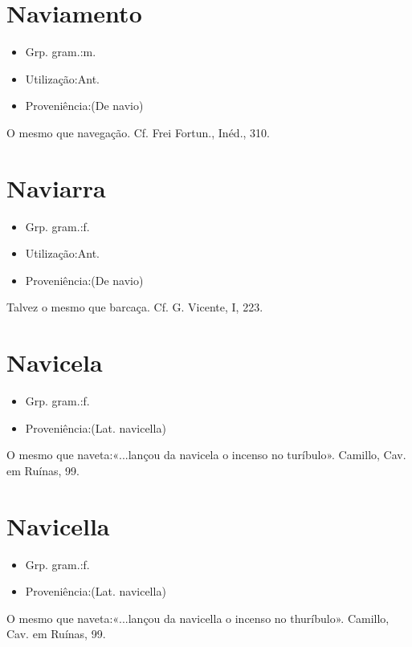 \section{Naviamento}
\begin{itemize}
\item {Grp. gram.:m.}
\end{itemize}
\begin{itemize}
\item {Utilização:Ant.}
\end{itemize}
\begin{itemize}
\item {Proveniência:(De \textunderscore navio\textunderscore )}
\end{itemize}
O mesmo que \textunderscore navegação\textunderscore . Cf. Frei Fortun., \textunderscore Inéd.\textunderscore , 310.
\section{Naviarra}
\begin{itemize}
\item {Grp. gram.:f.}
\end{itemize}
\begin{itemize}
\item {Utilização:Ant.}
\end{itemize}
\begin{itemize}
\item {Proveniência:(De \textunderscore navio\textunderscore )}
\end{itemize}
Talvez o mesmo que \textunderscore barcaça\textunderscore . Cf. G. Vicente, I, 223.
\section{Navicela}
\begin{itemize}
\item {Grp. gram.:f.}
\end{itemize}
\begin{itemize}
\item {Proveniência:(Lat. \textunderscore navicella\textunderscore )}
\end{itemize}
O mesmo que naveta:«\textunderscore ...lançou da navicela o incenso no turíbulo\textunderscore ». Camillo, \textunderscore Cav. em Ruínas\textunderscore , 99.
\section{Navicella}
\begin{itemize}
\item {Grp. gram.:f.}
\end{itemize}
\begin{itemize}
\item {Proveniência:(Lat. \textunderscore navicella\textunderscore )}
\end{itemize}
O mesmo que naveta:«\textunderscore ...lançou da navicella o incenso no thuríbulo\textunderscore ». Camillo, \textunderscore Cav. em Ruínas\textunderscore , 99.
